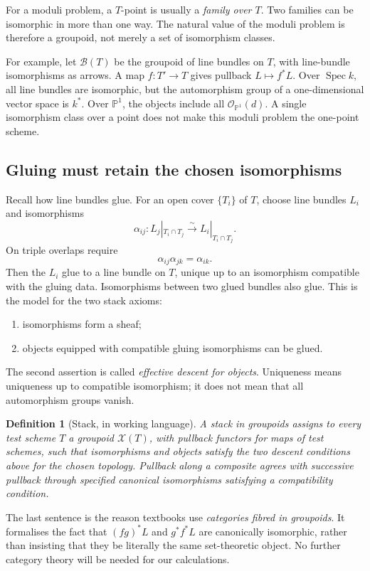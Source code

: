 \documentclass[11pt,a4paper]{article}
\numberwithin{equation}{section}
\newtheorem{definition}[proposition]{Definition}
\theoremstyle{definition}
\newcommand{\PP}{\mathbb P}
\newcommand{\OO}{\mathcal O}
\newcommand{\cX}{\mathcal X}
\newcommand{\Spec}{\operatorname{Spec}}
\begin{document}
For a moduli problem, a $T$-point is usually a \emph{family over $T$}. Two
families can be isomorphic in more than one way. The natural value of the moduli
problem is therefore a groupoid, not merely a set of isomorphism classes.

For example, let $\mathcal B(T)$ be the groupoid of line bundles on $T$, with
line-bundle isomorphisms as arrows. A map $f:T'\to T$ gives pullback
$L\mapsto f^*L$. Over $\Spec k$, all line bundles are isomorphic, but the
automorphism group of a one-dimensional vector space is $k^*$. Over $\PP^1$,
the objects include all $\OO_{\PP^1}(d)$. A single isomorphism class over a point
does not make this moduli problem the one-point scheme.

\subsection{Gluing must retain the chosen isomorphisms}
Recall how line bundles glue. For an open cover $\{T_i\}$ of $T$, choose line
bundles $L_i$ and isomorphisms
\[
 \alpha_{ij}:L_j|_{T_i\cap T_j}\xrightarrow{\sim}
                 L_i|_{T_i\cap T_j}.
\]
On triple overlaps require
\[
 \alpha_{ij}\alpha_{jk}=\alpha_{ik}.
\]
Then the $L_i$ glue to a line bundle on $T$, unique up to an isomorphism
compatible with the gluing data. Isomorphisms between two glued bundles also glue.
This is the model for the two stack axioms:
\begin{enumerate}
\item isomorphisms form a sheaf;
\item objects equipped with compatible gluing isomorphisms can be glued.
\end{enumerate}
The second assertion is called \emph{effective descent for objects}. Uniqueness
means uniqueness up to compatible isomorphism; it does not mean that all
automorphism groups vanish.

\begin{definition}[Stack, in working language]
A stack in groupoids assigns to every test scheme $T$ a groupoid $\cX(T)$,
with pullback functors for maps of test schemes, such that isomorphisms and
objects satisfy the two descent conditions above for the chosen topology.
Pullback along a composite agrees with successive pullback through specified
canonical isomorphisms satisfying a compatibility condition.
\end{definition}

The last sentence is the reason textbooks use \emph{categories fibred in
groupoids}. It formalises the fact that $(fg)^*L$ and $g^*f^*L$ are canonically
isomorphic, rather than insisting that they be literally the same set-theoretic
object. No further category theory will be needed for our calculations.
\end{document}
